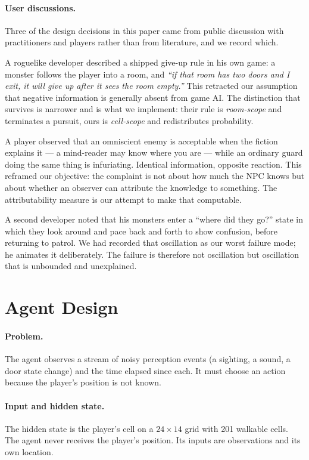 \documentclass{article}
\begin{document}
\paragraph{User discussions.}
Three of the design decisions in this paper came from public discussion with practitioners and
players rather than from literature, and we record which.

A roguelike developer described a shipped give-up rule in his own game: a monster follows the
player into a room, and \textit{``if that room has two doors and I exit, it will give up after it
sees the room empty.''} This retracted our assumption that negative information is generally
absent from game AI. The distinction that survives is narrower and is what we implement: their
rule is \emph{room-scope} and terminates a pursuit, ours is \emph{cell-scope} and redistributes
probability.

A player observed that an omniscient enemy is acceptable when the fiction explains it --- a
mind-reader may know where you are --- while an ordinary guard doing the same thing is
infuriating. Identical information, opposite reaction. This reframed our objective: the
complaint is not about how much the NPC knows but about whether an observer can attribute the
knowledge to something. The attributability measure is our attempt to make that computable.

A second developer noted that his monsters enter a ``where did they go?'' state in which they
look around and pace back and forth to show confusion, before returning to patrol. We had
recorded that oscillation as our worst failure mode; he animates it deliberately. The failure
is therefore not oscillation but oscillation that is unbounded and unexplained.

\section{Agent Design}
\label{sec:agent}

\paragraph{Problem.}
The agent observes a stream of noisy perception events (a sighting, a sound, a door state
change) and the time elapsed since each. It must choose an action because the player's position
is not known.

\paragraph{Input and hidden state.}
The hidden state is the player's cell on a $24\times14$ grid with 201 walkable cells. The agent
never receives the player's position. Its inputs are observations and its own location.
\end{document}
